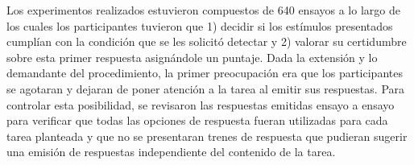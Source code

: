 Los experimentos realizados estuvieron compuestos de 640 ensayos a lo largo de los cuales los participantes tuvieron que 1) decidir si los estímulos presentados cumplían con la condición que se les solicitó detectar y 2) valorar su certidumbre sobre esta primer respuesta asignándole un puntaje. Dada la extensión y lo demandante del procedimiento, la primer preocupación era que los participantes se agotaran y dejaran de poner atención a la tarea al emitir sus respuestas. Para controlar esta posibilidad, se revisaron las respuestas emitidas ensayo a ensayo para verificar que todas las opciones de respuesta fueran utilizadas para cada tarea planteada y que no se presentaran trenes de respuesta que pudieran sugerir una emisión de respuestas independiente del contenido de la tarea.\\

